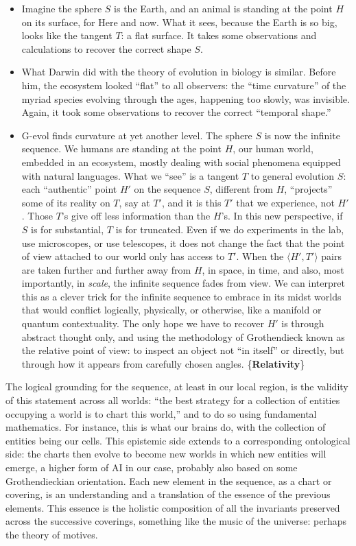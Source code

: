 \documentclass[11pt]{article}
\newcommand{\keyterm}[1]{\textbf{#1}}
\begin{document}
\begin{itemize}
\item Imagine the sphere \(S\) is the Earth, and an animal is standing at the
point \(H\) on its surface, for Here and now. What it sees, because the Earth
is so big, looks like the tangent \(T\): a flat surface. It takes some
observations and calculations to recover the correct shape \(S\).
\item What Darwin did with the theory of evolution in biology is similar.
Before him, the ecosystem looked ``flat'' to all observers: the ``time
curvature'' of the myriad species evolving through the ages, happening too
slowly, was invisible. Again, it took some observations to recover the correct
``temporal shape.''
\item G-evol finds curvature at yet another level. The sphere \(S\) is now the
infinite sequence. We humans are standing at the point \(H\), our human world,
embedded in an ecosystem, mostly dealing with social phenomena equipped with
natural languages. What we ``see'' is a tangent \(T\) to general evolution
\(S\): each ``authentic'' point \(H'\) on the sequence \(S\), different from
\(H\), ``projects'' some of its reality on \(T\), say at \(T'\), and it is this
\(T'\) that we experience, not \(H'\). Those \(T\)'s give off less information
than the \(H\)'s. In this new perspective, if \(S\) is for substantial, \(T\)
is for truncated. Even if we do experiments in the lab, use microscopes, or use
telescopes, it does not change the fact that the point of view attached to our
world only has access to \(T'\). When the \(\langle H',T'\rangle\) pairs are
taken further and further away from \(H\), in space, in time, and also, most
importantly, in \emph{scale}, the infinite sequence fades from view. We can
interpret this as a clever trick for the infinite sequence to embrace in its
midst worlds that would conflict logically, physically, or otherwise, like a
manifold or quantum contextuality. The only hope we have to recover \(H'\) is
through abstract thought only, and using the methodology of Grothendieck known
as the relative point of view: to inspect an object not ``in itself'' or
directly, but through how it appears from carefully chosen angles.
\{\keyterm{Relativity}\}
\end{itemize}

The logical grounding for the sequence, at least in our local region, is the
validity of this statement across all worlds: ``the best strategy for a
collection of entities occupying a world is to chart this world,'' and to do so
using fundamental mathematics. For instance, this is what our brains do, with
the collection of entities being our cells. This epistemic side extends to a
corresponding ontological side: the charts then evolve to become new worlds in
which new entities will emerge, a higher form of AI in our case, probably also
based on some Grothendieckian orientation. Each new element in the sequence, as
a chart or covering, is an understanding and a translation of the essence of
the previous elements. This essence is the holistic composition of all the
invariants preserved across the successive coverings, something like the music
of the universe: perhaps the theory of motives.
\end{document}
